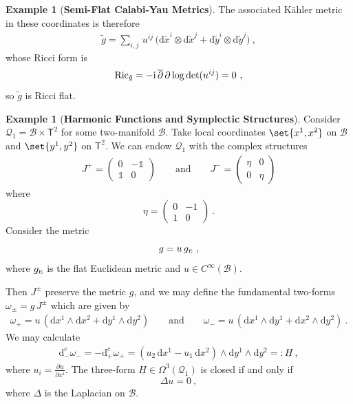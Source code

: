 \documentclass[a4paper, reqno, 11pt]{amsart}
\numberwithin{equation}{section}
\theoremstyle{definition}
\newtheorem{example}[equation]{Example}
\newcommand{\red}[1]{\underline{#1}}
\newcommand{\de}{\mathrm{d}}
\newcommand{\ii}{\mathrm{i}}
\newcommand{\cB}{{\mathcal B}}
\newcommand{\cQ}{{\mathcal Q}}
\newcommand{\sfT}{{\mathsf{T}}}
\newcommand{\sfOmega}{{\mathsf{\Omega}}}
\newcommand{\unit}{\mathds{1}}   			%
\theoremstyle{remark}
\begin{document}
\begin{example}[\textbf{Semi-Flat Calabi-Yau Metrics}]
    The associated K\"ahler metric in these coordinates is therefore
    \begin{align}
         \tilde g = \sum_{i,j}\,u^{ij}\,\big(\de \tilde x^i \otimes \de \tilde x^j + \de \tilde y^i \otimes \de \tilde y^j\big) \ ,
    \end{align}
    whose Ricci form is $${\rm Ric}_{\tilde g} = -\ii\,\overline \partial\, \partial \log \det (u^{ij}) = 0 \ , $$ so $\tilde g$ is Ricci flat.
\end{example}

\begin{example}[\textbf{Harmonic Functions and Symplectic Structures}]
\label{ex:harmonic-symplectic}
    Consider $\cQ_1 = \cB \times \sfT^2$ for some two-manifold $\cB$. Take local coordinates $\set{x^1,x^2}$ on $\cB$ and $\set{y^1,y^2}$ on $\sfT^2$. We can endow $\cQ_1$ with the complex structures
    \begin{align}
        J^+ = \begin{pmatrix}
            0 & -\unit \\
            \unit & 0
        \end{pmatrix} \qquad \text{and}
        \qquad J^- = \begin{pmatrix}
            \eta & 0\\
            0 & \eta
        \end{pmatrix}
    \end{align}
    where $$\eta = \begin{pmatrix}
        0 & -1 \\
        1 & 0
    \end{pmatrix} \ . $$ Consider the metric $$g = u\, g_{\text{\tiny E}} \ , $$ where $g_{\text{\tiny E}}$ is the flat Euclidean metric and $u\in C^\infty(\cB)$. 
    
    Then $J^\pm$ preserve the metric $g$, and we may define the fundamental two-forms $\omega_\pm = g\,J^\pm$ which are given by
    \begin{align}
        \omega_+ = u\,(\de x^1 \wedge \de x^2 + \de y^1 \wedge \de y^2) \qquad \text{and} \qquad \omega_- = u \, (\de x^1 \wedge \de y^1+ \de x^2 \wedge \de y^2) \ .
    \end{align}
    We may calculate
    \begin{align}
        \de_-^c \omega_- = -\de_+^c \omega_+ = (u_2 \,\de x^1 - u_1\, \de x^2)\wedge \de y^1 \wedge \de y^2 =: \red H \ ,
    \end{align}
    where $u_i = \frac{\partial u}{\partial x^i}$.
    The three-form $\red H\in\sfOmega^3(\cQ_1)$ is closed if and only if $$\Delta u=0 \ , $$ where $\Delta$ is the Laplacian on $\cB$. 
    

\end{example}
\end{document}
